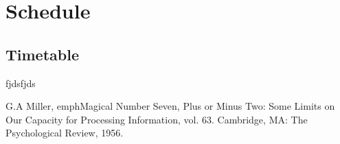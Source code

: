 \documentclass[a4paper, 11pt]{article}
\begin{document}
\section{Schedule}
\subsection{Timetable}

\clearpage


\begin{thebibliography}{11}

	fjdsfjds
	
	G.A Miller, emph{Magical Number Seven, Plus or Minus Two: Some Limits on Our Capacity for Processing Information}, vol. 63. Cambridge, MA: The Psychological Review, 1956.

\end{thebibliography}
\end{document}
